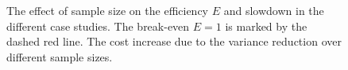 \begin{figure}[htb]
  \myfloatalign
  \quad
  \caption[Effect of sample size on control variate performance]{
    The effect of sample size on the efficiency $E$ and slowdown in
    the different case studies.
    The break-even $E=1$ is marked by the dashed red line.
  The cost increase due to the variance reduction over different sample sizes.}
  \label{fig:sample_sizes}
\end{figure}

